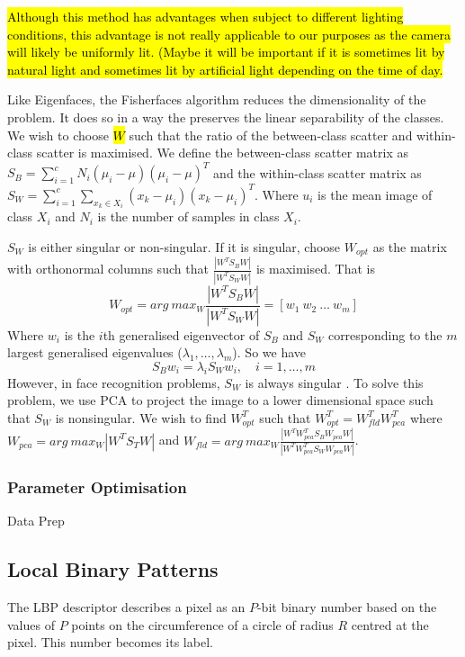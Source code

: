 \documentclass{article}
\begin{document}
\hl{Although this method has advantages when subject to different lighting conditions, this advantage is not really applicable to our purposes as the camera will likely be uniformly lit. (Maybe it will be important if it is sometimes lit by natural light and sometimes lit by artificial light depending on the time of day.}

Like Eigenfaces, the Fisherfaces algorithm reduces the dimensionality of the problem. It does so in a way the preserves the linear separability of the classes. We wish to choose \hl{$W$} such that the ratio of the between-class scatter and within-class scatter is maximised. We define the between-class scatter matrix as $S_B = \sum_{i=1}^{c}N_i(\mu_i - \mu)(\mu_i - \mu)^T$ and the within-class scatter matrix as  $S_W = \sum_{i=1}^{c}\sum_{x_k\in X_i}(x_k - \mu_i)(x_k - \mu_i)^T$. Where $u_i$ is the mean image of class $X_i$ and $N_i$ is the number of samples in class $X_i$.

$S_W$ is either singular or non-singular. If it is singular, choose $W_{opt}$ as the matrix with orthonormal columns such that $\frac{|W^TS_BW|}{|W^TS_WW|}$ is maximised. That is
\begin{equation}
	W_{opt} = arg\ max_W \frac{|W^TS_BW|}{|W^TS_WW|} = [w_1\ w_2\ \ldots\ w_m]
\end{equation}
Where $w_i$ is the $i$th generalised eigenvector of $S_B$ and $S_W$ corresponding to the $m$ largest generalised eigenvalues ($\lambda_1, \ldots, \lambda_m$). So we have
\begin{equation}
	S_Bw_i = \lambda_iS_Ww_i,\quad i=1, \ldots, m
\end{equation}
However, in face recognition problems, $S_W$ is always singular \cite{belhumeur1997eigenfaces}. To solve this problem, we use PCA to project the image to a lower dimensional space such that $S_W$ is nonsingular. We wish to find $W_{opt}^T$ such that $W_{opt}^T = W_{fld}^TW_{pca}^T$ where $W_{pca} = arg\ max_W|W^TS_TW|$ and $W_{fld} = arg\ max_W\frac{|W^TW_{pca}^TS_BW_{pca}W|}{|W^TW_{pca}^TS_WW_{pca}W|}$.

\subsubsection{Parameter Optimisation}
Data Prep

\subsection{Local Binary Patterns}
The LBP descriptor describes a pixel as an $P$-bit binary number based on the values of $P$ points on the circumference of a circle of radius $R$ centred at the pixel. This number becomes its label.
\end{document}
